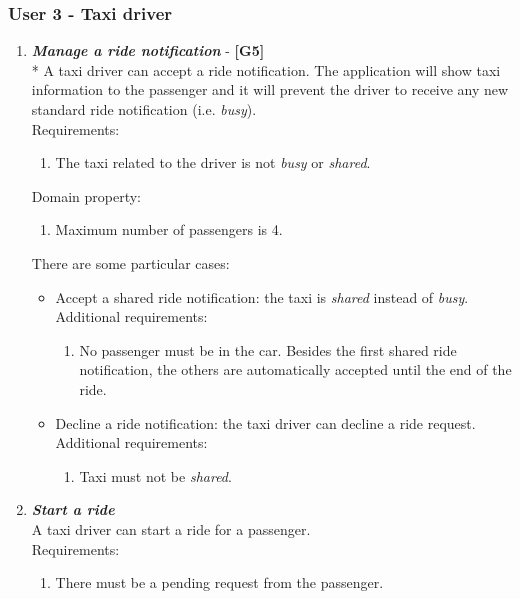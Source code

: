 \documentclass{article}
\begin{document}
\subsubsection{User 3 - Taxi driver}
\begin{enumerate}

\item \textit{\textbf{Manage a ride notification}} - \textbf{[G5]}\\*
A taxi driver can accept a ride notification. The application will show taxi information to the passenger and it will prevent the driver to receive any new standard ride notification  (i.e. \textit{busy}).\\
Requirements:
\begin{enumerate}
\item The taxi related to the driver is not \textit{busy} or \textit{shared}.
\end{enumerate}
Domain property:
\begin{enumerate}
\item Maximum number of passengers is 4.
\end{enumerate}
There are some particular cases:
\begin{itemize}
\item Accept a shared ride notification: the taxi is \textit{shared} instead of \textit{busy}.\\
Additional requirements:
\begin{enumerate}
\item No passenger must be in the car. Besides the first shared ride notification, the others are automatically accepted until the end of the ride.
\end{enumerate}
\item Decline a ride notification: the taxi driver can decline a ride request.\\
Additional requirements:
\begin{enumerate}
\item Taxi must not be \textit{shared}.
\end{enumerate}
\end{itemize}

\item \textit{\textbf{Start a ride}}\\
A taxi driver can start a ride for a passenger.\\
Requirements:
\begin{enumerate}
\item There must be a pending request from the passenger.
\end{enumerate}


\end{enumerate}
\end{document}
